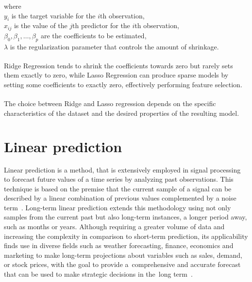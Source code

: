 \documentclass[12pt]{report}
\begin{document}
\noindent where\\
\(y_i\) is the target variable for the \(i\)th observation,\\
\(x_{ij}\) is the value of the \(j\)th predictor for the \(i\)th observation,\\
\(\beta_0, \beta_1, \ldots, \beta_p\) are the coefficients to be estimated,\\
\(\lambda\) is the regularization parameter that controls the amount of shrinkage.\\
\\
\noindent Ridge Regression tends to shrink the coefficients towards zero but rarely sets
them exactly to zero, while Lasso Regression can produce sparse models by setting some
coefficients to exactly zero, effectively performing feature selection.\\
\\
The choice between Ridge and Lasso regression depends on the specific characteristics of the dataset and the desired properties of the resulting model.

\section{Linear prediction}\label{lp}
Linear prediction is a method, that is extensively employed in signal
processing to forecast future values of a time series by analyzing past observations.
This technique is based on the premise that the current sample of a signal can be described by a linear combination
of previous values complemented by a noise term~\cite{vaidyanathan2007theory,  WOS:000415735500004}. Long-term linear
prediction extends this methodology using not only samples from the current past but also long-term instances, a longer period away, such as months
or years. Although requiring a greater volume of data and increasing the complexity in comparison to
 short-term prediction, its applicability finds use in diverse fields such as weather forecasting, finance, economics and
marketing to make long-term projections about variables such as sales, demand, or stock
prices, with the goal to provide a~comprehensive and accurate forecast that can be used to
make strategic decisions in the~long term~\cite{WOS:A1989AG08300005}.
%
\end{document}
